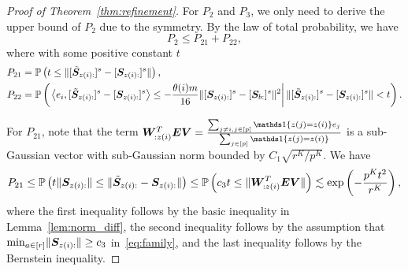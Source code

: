 \documentclass[lettersize,onecolumn,journal]{IEEEtran}
\theoremstyle{definition}
\theoremstyle{definition}
\newcommand{\of}[1]{\left(#1\right)}
\newcommand{\ang}[1]{\left\langle#1\right\rangle}
\begin{document}
\begin{proof}[Proof of Theorem~\ref{thm:refinement}]
    For $P_2$ and $P_3$, we only need to derive the upper bound of $P_2$ due to the symmetry. By the law of total probability, we have 
    \begin{equation}\label{eq:p2}
        P_2 \leq P_{21} + P_{22},
    \end{equation}
    where with some positive constant $t$
    \begin{align}
        P_{21}& =  \bbP \of{ t \leq   \onormSize{}{ [ \tilde  \mS_{z(i):} ]^s - [ \mS_{z(i):} ]^s }},\\
        P_{22} &= \bbP \of{ \left. \ang{e_i, [ \tilde  \mS_{z(i):} ]^s - [ \mS_{z(i):} ]^s} \leq -\frac{\theta(i)m}{16}  \onormSize{}{ [ \mS_{z(i):}  ]^s - [ \mS_{b:}  ]^s  }^2 \right| \onormSize{}{ [ \tilde  \mS_{z(i):} ]^s - [ \mS_{z(i):} ]^s } < t  }.
    \end{align}
    
    For $P_{21}$, note that the term $\mW^T_{: z(i)} \mE \mV = \frac{ \sum_{ j \neq i, j \in [p]} \ind \{ z(j) = z(i) \} e_j }{\sum_{j \in [p]} \ind \{ z(j) = z(i) \} }$  is a sub-Gaussian vector with sub-Gaussian norm bounded by $C_1 \sqrt{r^K/ p^K}$. We have
    \begin{align}
        P_{21} \leq \bbP\of{ t \onormSize{}{\mS_{z(i):} } \leq \onormSize{}{ \tilde  \mS_{z(i):}  -  \mS_{z(i):} }  } \leq \bbP\of{c_3 t \leq  \onormSize{}{ \mW^T_{: z(i)} \mE \mV  } } 
        \lesssim \exp\of{ - \frac{p^K t^2}{r^K} }, \label{eq:p21}
    \end{align}
    where the first inequality follows by the basic inequality in Lemma~\ref{lem:norm_diff}, the second inequality follows by the assumption that $ \min_{a \in [r]} \lVert\bm S_{z(i):}\rVert \geq c_3$ in~\eqref{eq:family}, and the last inequality follows by the Bernstein inequality.
    

\end{proof}
\end{document}
